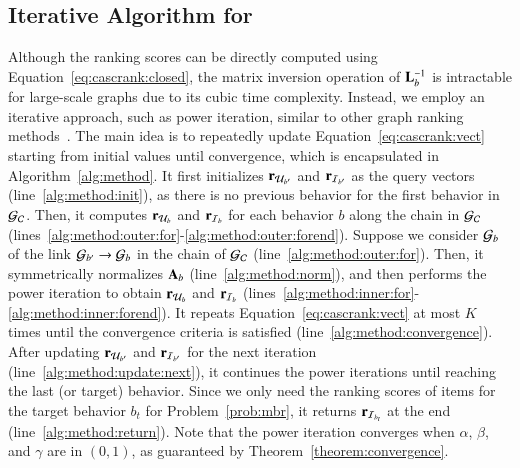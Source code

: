 \subsection{Iterative Algorithm for \method}
\label{sec:proposed:alg}
Although the ranking scores can be directly computed using Equation~\eqref{eq:cascrank:closed}, the matrix inversion operation of $\mathbf{L}_{b}^{-1}$ is intractable for large-scale graphs due to its cubic time complexity.
Instead, we employ an iterative approach, such as power iteration, similar to other graph ranking methods~\cite{HeHDWLZW20, HeHGKW17, BrinB98}. 
The main idea is to repeatedly update Equation~\eqref{eq:cascrank:vect} starting from initial values until convergence, which is encapsulated in Algorithm~\ref{alg:method}.
It first initializes $\mathbf{r}_{\mathcal{U}_{b'}}$ and $\mathbf{r}_{\mathcal{I}_{b'}}$ as the query vectors (line~\ref{alg:method:init}), as there is no previous behavior for the first behavior in $\mathcal{G}_{\mathcal{C}}$.
Then, it computes $\mathbf{r}_{\mathcal{U}_{b}}$ and $\mathbf{r}_{\mathcal{I}_{b}}$ for each behavior $b$ along the chain in $\mathcal{G}_{\mathcal{C}}$ (lines~\ref{alg:method:outer:for}-\ref{alg:method:outer:forend}).
Suppose we consider $\mathcal{G}_{b}$ of the link $\mathcal{G}_{b'} \rightarrow \mathcal{G}_{b}$ in the chain of $\mathcal{G}_{\mathcal{C}}$ (line~\ref{alg:method:outer:for}). 
Then, it symmetrically normalizes $\mathbf{A}_{b}$ (line~\ref{alg:method:norm}), and then performs the power iteration to obtain $\mathbf{r}_{\mathcal{U}_{b}}$ and $\mathbf{r}_{\mathcal{I}_{b}}$ (lines~\ref{alg:method:inner:for}-\ref{alg:method:inner:forend}).
It repeats Equation~\eqref{eq:cascrank:vect} at most $K$ times until the convergence criteria is satisfied (line~\ref{alg:method:convergence}).
After updating $\mathbf{r}_{\mathcal{U}_{b'}}$ and $\mathbf{r}_{\mathcal{I}_{b'}}$ for the next iteration (line~\ref{alg:method:update:next}), it continues the power iterations until reaching the last (or target) behavior.
Since we only need the ranking scores of items for the target behavior $b_t$ for Problem~\ref{prob:mbr}, it returns $\mathbf{r}_{\mathcal{I}_{b_t}}$ at the end (line~\ref{alg:method:return}).
Note that the power iteration converges when $\alpha$, $\beta$, and $\gamma$ are in $(0, 1)$, as guaranteed by Theorem~\ref{theorem:convergence}.


